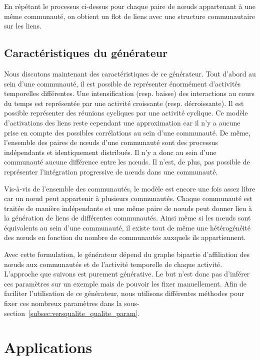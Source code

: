 En répétant le processus ci-dessus pour chaque paire de n\oe uds appartenant à une même communauté, on obtient un flot de liens avec une structure communautaire sur les liens.

\subsection{Caractéristiques du générateur}

Nous discutons maintenant des caractéristiques de ce générateur.
Tout d'abord au sein d'une communauté, il est possible de représenter énormément d'activités temporelles différentes.
Une intensification (resp. baisse) des interactions au cours du temps est représentée par une activité croissante (resp. décroissante).
Il est possible représenter des réunions cycliques par une activité cyclique. 
Ce modèle d'activations des liens reste  cependant une approximation car il n'y a aucune prise en compte des possibles corrélations au sein d'une communauté.
De même, l'ensemble des paires de n\oe uds d'une communauté sont des processus indépendants et identiquement distribués.
Il n'y a donc au sein d'une communauté aucune différence entre les n\oe uds.
Il n'est, de plus, pas possible de représenter l'intégration progressive de n\oe uds dans une communauté.

Vis-à-vis de l'ensemble des communautés, le modèle est encore une fois assez libre car un n\oe ud peut appartenir à plusieurs communautés.
Chaque communauté est traitée de manière indépendante et une même paire de n\oe uds peut donner lieu à la génération de liens de différentes communautés.
Ainsi même si les n\oe uds sont équivalents au sein d'une communauté, il existe tout de même une hétérogénéité des n\oe uds en fonction du nombre de communautés auxquels ils appartiennent.

\bigskip

Avec cette formulation, le générateur dépend du graphe bipartie d'affiliation des n\oe uds aux communautés et de l'activité temporelle de chaque activité.
L'approche que suivons est purement générative.
Le but n'est donc pas d'inférer ces paramètres sur un exemple mais de pouvoir les fixer manuellement.
Afin de faciliter l'utilisation de ce générateur, nous utilisons différentes méthodes pour fixer ces nombreux paramètres dans la sous-section~\ref{subsec:versqualite_qualite_param}.


\section{Applications}
\label{sec:versqualite_Applications}


